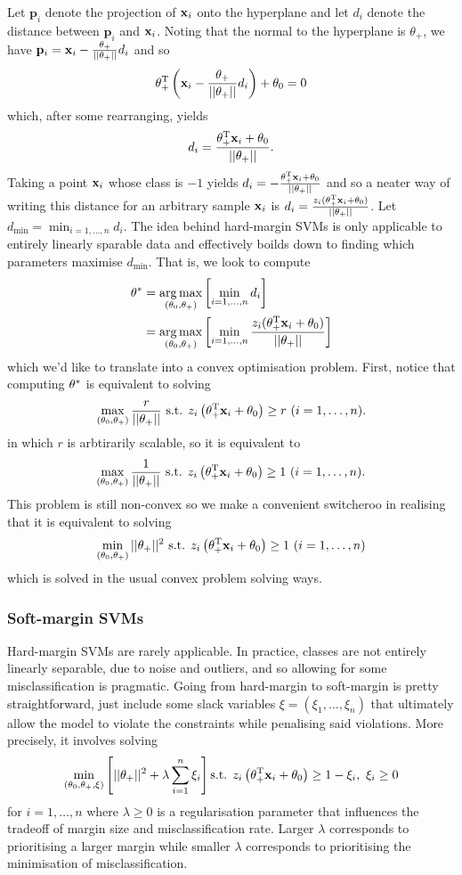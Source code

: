 \documentclass[11pt]{article}
\begin{document}
\noindent Let $\mathbf{p}_i$ denote the projection of $\mathbf{x}_i$ onto the hyperplane and let $d_i$ denote the distance between $\mathbf{p}_i$ and $\mathbf{x}_i$. Noting that the normal to the hyperplane is $\theta_+$, we have $\mathbf{p}_i=\mathbf{x}_i-\frac{\theta_+}{||\theta_+||}d_i$ and so
$$
\theta_+^{\text{T}}\left(\mathbf{x}_i-\frac{\theta_+}{||\theta_+||}d_i\right)+\theta_0
=
0
$$
which, after some rearranging, yields
$$
d_i
=
\frac{\theta_+^{\text{T}}\mathbf{x}_i+\theta_0}{||\theta_+||}.
$$
Taking a point $\mathbf{x}_i$ whose class is $-1$ yields $d_i=-\frac{\theta_+^{\text{T}}\mathbf{x}_i+\theta_0}{||\theta_+||}$ and so a neater way of writing this distance for an arbitrary sample $\mathbf{x}_i$ is $d_i=\frac{z_i(\theta_+^{\text{T}}\mathbf{x}_i+\theta_0)}{||\theta_+||}$. Let $d_{\text{min}}=\min_{i=1,\dots,n}d_i$. The idea behind hard-margin SVMs is only applicable to entirely linearly sparable data and effectively boilds down to finding which parameters maximise $d_{\text{min}}$. That is, we look to compute
\begin{align*}
    \theta^{*}
    &=
    \operatorname*{arg\,max}_{(\theta_0,\theta_+)}\left[\min_{i=1,\dots,n}d_i\right]\\
    &=
    \operatorname*{arg\,max}_{(\theta_0,\theta_+)}\left[\min_{i=1,\dots,n}\frac{z_i(\theta_+^{\text{T}}\mathbf{x}_i+\theta_0)}{||\theta_+||}\right]\\
\end{align*}
which we'd like to translate into a convex optimisation problem. First, notice that computing $\theta^{*}$ is equivalent to solving
$$
\max_{(\theta_0,\theta_+)}\frac{r}{||\theta_+||}\text{ s.t. } z_i\left(\theta_+^{\text{T}}\mathbf{x}_i+\theta_0\right)\geq r\text{ } (i=1,\dots,n).
$$
in which $r$ is arbtirarily scalable, so it is equivalent to
$$
\max_{(\theta_0,\theta_+)}\frac{1}{||\theta_+||}\text{ s.t. } z_i\left(\theta_+^{\text{T}}\mathbf{x}_i+\theta_0\right)\geq 1\text{ } (i=1,\dots,n).
$$
This problem is still non-convex so we make a convenient switcheroo in realising that it is equivalent to solving
$$
\min_{(\theta_0,\theta_+)}||\theta_+||^2\text{ s.t. } z_i\left(\theta_+^{\text{T}}\mathbf{x}_i+\theta_0\right)\geq 1\text{ } (i=1,\dots,n)
$$
which is solved in the usual convex problem solving ways.

\subsubsection{Soft-margin SVMs}

Hard-margin SVMs are rarely applicable. In practice, classes are not entirely linearly separable, due to noise and outliers, and so allowing for some misclassification is pragmatic. Going from hard-margin to soft-margin is pretty straightforward, just include some slack variables $\xi=(\xi_1,\dots,\xi_n)$ that ultimately allow the model to violate the constraints while penalising said violations. More precisely, it involves solving
$$
\min_{(\theta_0,\theta_+,\xi)}\left[||\theta_+||^2+\lambda\sum_{i=1}^n\xi_i\right]\text{s.t. } z_i\left(\theta_+^{\text{T}}\mathbf{x}_i+\theta_0\right)\geq 1-\xi_i,\text{ }\xi_i\geq0
$$
for $i=1,\dots,n$ where $\lambda\geq0$ is a regularisation parameter that influences the tradeoff of margin size and misclassification rate. Larger $\lambda$ corresponds to prioritising a larger margin while smaller $\lambda$ corresponds to prioritising the minimisation of misclassification.
\end{document}
